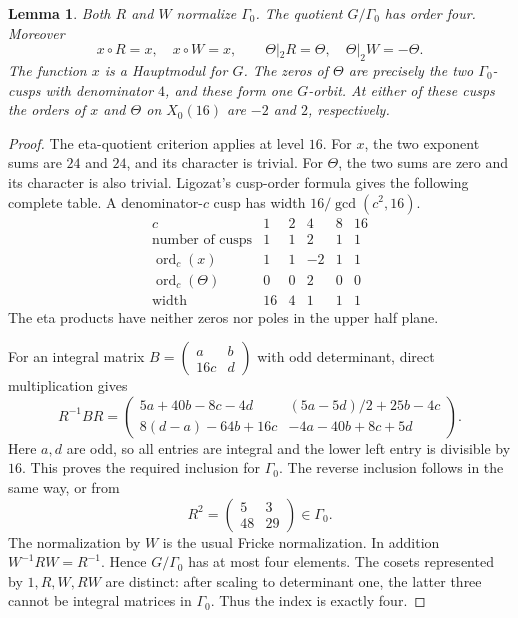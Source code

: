 \documentclass[11pt,a4paper]{article}
\newtheorem{lemma}[theorem]{Lemma}
\begin{document}
\begin{lemma}\label{raw:group}
Both $R$ and $W$ normalize $\Gamma_0$.  The quotient $G/\Gamma_0$ has
order four.  Moreover
\[
 x\circ R=x,\quad x\circ W=x,\qquad
 \Theta|_2R=\Theta,\quad \Theta|_2W=-\Theta.
\]
The function $x$ is a Hauptmodul for $G$.  The zeros of $\Theta$ are precisely
the two $\Gamma_0$-cusps with denominator $4$, and these form one $G$-orbit.
At either of these cusps the orders of $x$ and $\Theta$ on $X_0(16)$ are
$-2$ and $2$, respectively.
\end{lemma}

\begin{proof}
The eta-quotient criterion applies at level $16$.  For $x$, the two exponent
sums are $24$ and $24$, and its character is trivial.  For $\Theta$, the two
sums are zero and its character is also trivial.  Ligozat's cusp-order formula \cite[Proposition~3.2.8]{Ligozat}
gives the following complete table.  A denominator-$c$ cusp has width
$16/\gcd(c^2,16)$.
\[
\begin{array}{c|rrrrr}
 c&1&2&4&8&16\\ \hline
 \text{number of cusps}&1&1&2&1&1\\
 \operatorname{ord}_c(x)&1&1&-2&1&1\\
 \operatorname{ord}_c(\Theta)&0&0&2&0&0\\
 \text{width}&16&4&1&1&1
\end{array}
\]
The eta products have neither zeros nor poles in the upper half plane.

For an integral matrix $B=\left(\begin{smallmatrix}a&b\\16c&d\end{smallmatrix}\right)$
with odd determinant, direct multiplication gives
\begin{equation}\label{raw:conjugation}
 R^{-1}BR=
 \begin{pmatrix}
 5a+40b-8c-4d & (5a-5d)/2+25b-4c\\
 8(d-a)-64b+16c & -4a-40b+8c+5d
 \end{pmatrix}.
\end{equation}
Here $a,d$ are odd, so all entries are integral and the lower left entry is
divisible by $16$.  This proves the required inclusion for $\Gamma_0$.
The reverse inclusion follows in the same way, or from
\[
 R^2=\begin{pmatrix}5&3\\48&29\end{pmatrix}\in\Gamma_0.
\]
The normalization by $W$ is the usual Fricke normalization.  In addition
$W^{-1}RW=R^{-1}$.  Hence $G/\Gamma_0$ has at most four elements.
The cosets represented by $1,R,W,RW$ are distinct: after scaling to determinant
one, the latter three cannot be integral matrices in $\Gamma_0$.
Thus the index is exactly four.


\end{proof}
\end{document}
